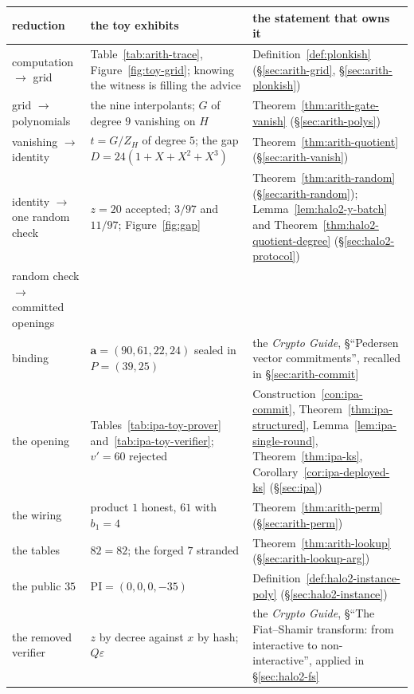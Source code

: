 \documentclass[11pt,a4paper]{article}
\theoremstyle{definition}
\newcommand{\ZH}{Z_H}
\begin{document}
\begin{table}[htbp]
\centering
\footnotesize
\begin{tabular}{@{}p{3.0cm} p{4.0cm} p{6.0cm}@{}}
\toprule
reduction & the toy exhibits & the statement that owns it \\
\midrule
computation $\to$ grid & Table~\ref{tab:arith-trace},
  Figure~\ref{fig:toy-grid}; knowing the witness is filling the advice
  & Definition~\ref{def:plonkish} (\S\ref{sec:arith-grid},
  \S\ref{sec:arith-plonkish}) \\
grid $\to$ polynomials & the nine interpolants; $G$ of degree $9$
  vanishing on $H$ & Theorem~\ref{thm:arith-gate-vanish}
  (\S\ref{sec:arith-polys}) \\
vanishing $\to$ identity & $t = G/\ZH$ of degree $5$; the gap
  $D = 24(1 + X + X^2 + X^3)$ & Theorem~\ref{thm:arith-quotient}
  (\S\ref{sec:arith-vanish}) \\
identity $\to$ one random check & $z = 20$ accepted; $3/97$ and
  $11/97$; Figure~\ref{fig:gap} & Theorem~\ref{thm:arith-random}
  (\S\ref{sec:arith-random}); Lemma~\ref{lem:halo2-y-batch} and
  Theorem~\ref{thm:halo2-quotient-degree} (\S\ref{sec:halo2-protocol}) \\
\addlinespace
random check $\to$ committed openings & & \\
\quad binding & $\mathbf a = (90, 61, 22, 24)$ sealed in
  $P = (39, 25)$ & the \emph{Crypto Guide}, \S``Pedersen vector
  commitments'', recalled in \S\ref{sec:arith-commit} \\
\quad the opening & Tables~\ref{tab:ipa-toy-prover}
  and~\ref{tab:ipa-toy-verifier}; $v' = 60$ rejected
  & Construction~\ref{con:ipa-commit},
  Theorem~\ref{thm:ipa-structured}, Lemma~\ref{lem:ipa-single-round},
  Theorem~\ref{thm:ipa-ks}, Corollary~\ref{cor:ipa-deployed-ks}
  (\S\ref{sec:ipa}) \\
\quad the wiring & product $1$ honest, $61$ with $b_1 = 4$
  & Theorem~\ref{thm:arith-perm} (\S\ref{sec:arith-perm}) \\
\quad the tables & $82 = 82$; the forged $7$ stranded
  & Theorem~\ref{thm:arith-lookup} (\S\ref{sec:arith-lookup-arg}) \\
\quad the public $35$ & $\mathrm{PI} = (0, 0, 0, -35)$
  & Definition~\ref{def:halo2-instance-poly}
  (\S\ref{sec:halo2-instance}) \\
\quad the removed verifier & $z$ by decree against $x$ by hash;
  $Q\varepsilon$ & the \emph{Crypto Guide}, \S``The Fiat--Shamir
  transform: from interactive to non-interactive'', applied in
  \S\ref{sec:halo2-fs} \\

\end{tabular}
\end{table}
\end{document}
